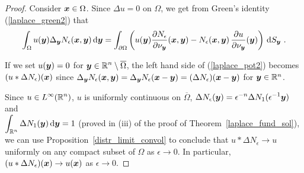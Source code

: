 \begin{proof}
Consider ${\bm{x}} \in \Omega$.
Since $\Delta u = 0$ on $\Omega$, we get from Green's identity
(\ref{laplace_green2}) that
\begin{equation} \label{laplace_pot2}
\int_{\Omega} u({\bm{y}}) \Delta_{{\bm{y}}}
N_{\epsilon}({\bm{x}},{\bm{y}}) \,\mathrm{d}{{\bm{y}}}
= \int_{\partial \Omega} \left( u({\bm{y}})
\frac{\partial{N_{\epsilon}}}{\partial \nu_{{\bm{y}}}}({\bm{x}},{\bm{y}}) -
N_{\epsilon}({\bm{x}},{\bm{y}}) \,
\frac{\partial{u}}{\partial \nu_{{\bm{y}}}}({\bm{y}})\right) \,\mathrm{d}{S}_{{\bm{y}}} \ .
\end{equation}

If we set $u({\bm{y}}) = 0$ for
$\displaystyle {\bm{y}} \in \mathbb{R}^n \setminus \overline{\Omega}$,
the left hand side of (\ref{laplace_pot2}) becomes
$(u \ast \Delta N_\epsilon)({\bm{x}})$ since
$\displaystyle \Delta_{{\bm{y}}} N_{\epsilon}({\bm{x}},{\bm{y}})
= \Delta_{{\bm{y}}} N_{\epsilon}({\bm{x}} - {\bm{y}}) =
(\Delta N_\epsilon)({\bm{x}}-{\bm{y}})$ for
${\bm{y}} \in \mathbb{R}^n$.

Since $\displaystyle u \in L^\infty(\mathbb{R}^n)$, $u$ is uniformly
continuous on $\overline{\Omega}$, 
$\displaystyle \Delta N_\epsilon({\bm{y}}) =
\epsilon^{-n}\Delta N_1(\epsilon^{-1}{\bm{y}})$ and\\
$\displaystyle \int_{\mathbb{R}^n} \Delta N_1({\bm{y}}) \,\mathrm{d}{{\bm{y}}} = 1$
(proved in (iii) of the proof of
Theorem~\ref{laplace_fund_sol}), we can use
Proposition~\ref{distr_limit_convol} to conclude that
$u \ast \Delta N_\epsilon \rightarrow u$ uniformly on any compact
subset of $\Omega$ as $\epsilon \rightarrow 0$.  In particular,
$(u \ast \Delta N_\epsilon)({\bm{x}}) \rightarrow u({\bm{x}})$ as
$\epsilon \rightarrow 0$.


\end{proof}
